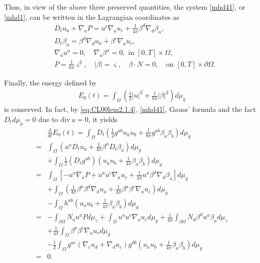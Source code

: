 \documentclass[12pt,reqno]{amsart}
\numberwithin{equation}{section}
\theoremstyle{definition}
\theoremstyle{remark}
\begin{document}
Thus, in view of the above three preserved quantities, the system \eqref{mhd41}, or \eqref{mhd1}, can be written in the Lagrangian coordinates as
\begin{subequations}\label{mhd4}
\begin{align}
    &D_tu_a+{\nabla}_a{P } =u^c{\nabla}_a u_c+\frac{1}{4\pi}\beta^d{\nabla}_d\beta_a,\label{mhd4.1}\\
    &D_t\beta_a=\beta^d{\nabla}_d u_a+\beta^c{\nabla}_a u_c,\label{mhd4.2}\\
    &{\nabla}_a u^a=0,\quad {\nabla}_a\beta^a=0, \text{ in } [0,T]\times \Omega,\label{mhd4.3}\\
    &{P }=\frac{1}{8\pi}{\varsigma}^2, \quad |\beta|={\varsigma}, \quad \beta\cdot N=0,\quad \text{on } [0,T]\times{\partial}\Omega.\label{mhd4.4}
\end{align}
\end{subequations}

Finally, the energy defined by
\begin{align}
  E_0(t)=\int_\Omega \left(\frac{1}{2}|u|^2+\frac{1}{8\pi}|\beta|^2\right)d\mu_g
\end{align}
is conserved. In fact, by \eqref{eq.CL00lem2.1.4}, \eqref{mhd41}, Gauss' formula and the fact $D_td\mu_g=0$ due to ${\mathrm{div}\,} u=0$, it yields
      \begin{align*}
        &\frac{d}{dt}E_0(t)=\int_\Omega D_t \left(\frac{1}{2}g^{ab}u_a u_b+\frac{1}{8\pi}g^{ab}\beta_a\beta_b\right)d\mu_g\\
        =&\int_\Omega \left(u^a D_t u_a+\frac{1}{4\pi} \beta^a D_t \beta_a\right) d\mu_g\\
        &+\int_\Omega \frac{1}{2}(D_t g^{ab}) \left(u_au_b+\frac{1}{4\pi}\beta_a\beta_b \right)d\mu_g\\
        =&\int_\Omega [-u^a{\nabla}_a{P }+u^au^c{\nabla}_a u_c+\frac{1}{4\pi}u^a \beta^d {\nabla}_d \beta_a]d\mu_g\\
        &+\int_\Omega\left(\frac{1}{4\pi}\beta^a \beta^d{\nabla}_d u_a+\frac{1}{4\pi}\beta^a \beta^c{\nabla}_a u_c\right)d\mu_g\\
        &-\int_\Omega h^{ab} \left(u_au_b+\frac{1}{4\pi}\beta_a\beta_b \right)d\mu_g\\
        =&-\int_{{\partial}\Omega} N_au^a{P } d\mu_\gamma+\int_{\Omega}  u^a u^c{\nabla}_a u_c d\mu_g+\frac{1}{4\pi}\int_{{\partial}\Omega} N_d\beta^d u^a\beta_a d\mu_\gamma\\
        &+\frac{1}{4\pi}\int_\Omega\beta^a \beta^c{\nabla}_a u_c d\mu_g\\
        &-\frac{1}{2}\int_\Omega g^{ac}({\nabla}_c u_d+{\nabla}_d u_c)g^{db} \left(u_au_b+\frac{1}{4\pi}\beta_a\beta_b \right)d\mu_g\\
        =&0.
      \end{align*}
\end{document}
